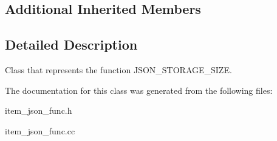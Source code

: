 \subsection*{Additional Inherited Members}


\subsection{Detailed Description}
Class that represents the function J\+S\+O\+N\+\_\+\+S\+T\+O\+R\+A\+G\+E\+\_\+\+S\+I\+ZE. 

The documentation for this class was generated from the following files\+:\begin{DoxyCompactItemize}
\item 
item\+\_\+json\+\_\+func.\+h\item 
item\+\_\+json\+\_\+func.\+cc\end{DoxyCompactItemize}
